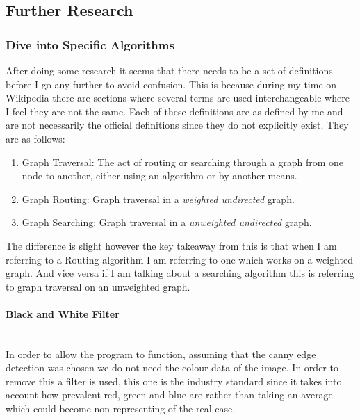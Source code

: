 \begin{flushleft}
        \subsection{Further Research}
            \subsubsection{Dive into Specific Algorithms}
            After doing some research it seems that there needs to be a set of definitions before I go any further to avoid confusion. This is because during my time on Wikipedia there are sections
            where several terms are used interchangeable where I feel they are not the same. Each of these definitions are as defined by me and are not necessarily the official definitions since they 
            do not explicitly exist. They are as follows: \\ \bk
            \begin{enumerate}
                \item Graph Traversal: The act of routing or searching through a graph from one node to another, either using an algorithm or by another means.
                \item Graph Routing: Graph traversal in a \emph{weighted undirected} graph.
                \item Graph Searching: Graph traversal in a \emph{unweighted undirected} graph.
            \end{enumerate}

            \bk
            The difference is slight however the key takeaway from this is that when I am referring to a Routing algorithm I am referring to one which works on a weighted graph. And vice versa if I am 
            talking about a searching algorithm this is referring to graph traversal on an unweighted graph. \\ \bk

            \paragraph{Black and White Filter}\mbox{} \\
            In order to allow the program to function, assuming that the canny edge detection was chosen we do not need the colour data of the image. In order to remove this a filter is used, this one is the
            industry standard since it takes into account how prevalent red, green and blue are rather than taking an average which could become non representing of the real case. \\ \bk
            

\end{flushleft}

